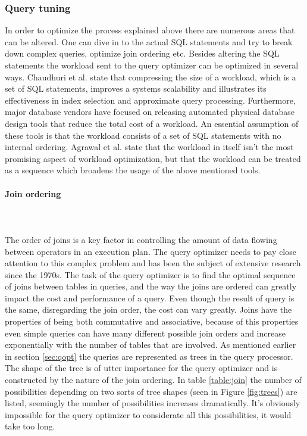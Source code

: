 \documentclass{cslthse-msc}
\begin{document}
\subsubsection{Query tuning}
In order to optimize the process explained above there are numerous areas that can be altered. One can dive in to the actual SQL statements and try to break down complex queries, optimize join ordering etc. Besides altering the SQL statements the workload sent to the query optimizer can be optimized in several ways. Chaudhuri et al. state that compressing the size of a workload, which is a set of SQL statements, improves a systems scalability and illustrates its effectiveness in index selection and approximate query processing\cite{compressing}. Furthermore, major database vendors have focused on releasing automated physical database design tools that reduce the total cost of a workload. An essential assumption of these tools is that the workload consists of a set of SQL statements with no internal ordering. Agrawal et al. state that the workload in itself isn't the most promising aspect of workload optimization, but that the workload can be treated as a sequence which broadens the usage of the above mentioned tools\cite{automatic}.

\paragraph*{Join ordering}\mbox{}\\\\
The order of joins is a key factor in controlling the amount of data flowing between operators in an execution plan. The query optimizer needs to pay close attention to this complex problem and has been the subject of extensive research since the 1970s\cite{join}. The task of the query optimizer is to find the optimal sequence of joins between tables in queries, and the way the joins are ordered can greatly impact the cost and performance of a query. Even though the result of query is the same, disregarding the join order, the cost can vary greatly. Joins have the properties of being both commutative and associative, because of this properties even simple queries can have many different possible join orders and increase exponentially with the number of tables that are involved. As mentioned earlier in section \ref{sec:qopt} the queries are represented as trees in the query processor. The shape of the tree is of utter importance for the query optimizer and is constructed by the nature of the join ordering. In table \ref{table:join} the number of possibilities depending on two sorts of tree shapes (seen in Figure \ref{fig:trees}) are listed, seemingly the number of possibilities increases dramatically. It's obviously impossible for the query optimizer to considerate all this possibilities, it would take too long.  
\end{document}
